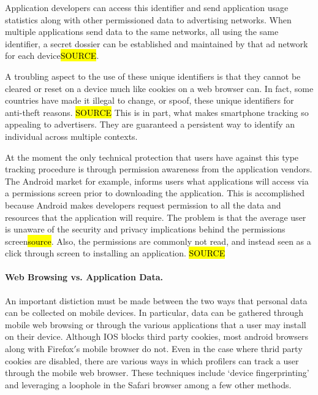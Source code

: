Application developers can access this identifier and send application usage statistics along with other permissioned data to advertising networks. When multiple applications send data to the same networks, all using the same identifier, a secret dossier can be established and maintained by that ad network for each device\hl{SOURCE}.

A troubling aspect to the use of these unique identifiers is that they cannot be cleared or reset on a device much like cookies on a web browser can. In fact, some countries have made it illegal to change, or spoof, these unique identifiers for anti-theft reasons. \hl{SOURCE} This is in part, what makes smartphone tracking so appealing to advertisers. They are guaranteed a persistent way to identify an individual across multiple contexts.

At the moment the only technical protection that users have against this type tracking procedure is through permission awareness from the application vendors. The Android market for example, informs users what applications will access via a permissions screen prior to downloading the application. This is accomplished because Android makes developers request permission to all the data and resources that the application will require. The problem is that the average user is unaware of the security and privacy implications behind the permissions screen\hl{source}. Also, the permissions are commonly not read, and instead seen as a click through screen to installing an application. \hl{SOURCE}  

		\paragraph{Web Browsing vs. Application Data.}
An important distiction must be made between the two ways that personal data can be collected on mobile devices. In particular, data can be gathered through mobile web browsing or through the various applications that a user may install on their device. Although IOS blocks third party cookies, most android browsers along with Firefox$'$s mobile browser do not\cite{Trust2013b}.  Even in the case where thrid party cookies are disabled, there are various ways in which profilers can track a user through the mobile web browser. These techniques include `device fingerprinting'\cite{Eff2010} and leveraging a loophole in the Safari browser \cite{John2012} among a few other methods\cite{Trust2013b}. 

